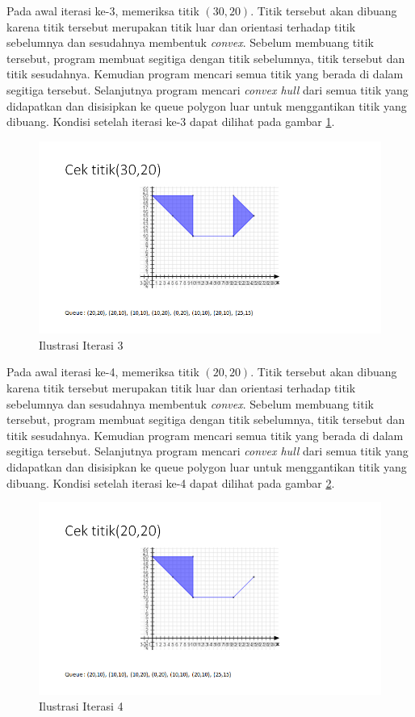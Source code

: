 \par Pada awal iterasi ke-3, memeriksa titik $(30,20)$. Titik tersebut akan dibuang karena titik tersebut merupakan titik luar dan orientasi terhadap titik sebelumnya dan sesudahnya membentuk \textit{convex}. Sebelum membuang titik tersebut, program membuat segitiga dengan titik sebelumnya, titik tersebut dan titik sesudahnya. Kemudian program mencari semua titik yang berada di dalam segitiga tersebut. Selanjutnya program mencari \textit{convex hull} dari semua titik yang didapatkan dan disisipkan ke queue polygon luar untuk menggantikan titik yang dibuang. Kondisi setelah iterasi ke-3 dapat dilihat pada gambar \ref{fig:iterasi-3}.
\begin{figure}[!h]
	\Centering
	\includegraphics [width=\columnwidth]{bab5/img/iterasi-3}
	\caption {Ilustrasi Iterasi 3}
	\label {fig:iterasi-3}
\end{figure}

\par Pada awal iterasi ke-4, memeriksa titik $(20,20)$. Titik tersebut akan dibuang karena titik tersebut merupakan titik luar dan orientasi terhadap titik sebelumnya dan sesudahnya membentuk \textit{convex}. Sebelum membuang titik tersebut, program membuat segitiga dengan titik sebelumnya, titik tersebut dan titik sesudahnya. Kemudian program mencari semua titik yang berada di dalam segitiga tersebut. Selanjutnya program mencari \textit{convex hull} dari semua titik yang didapatkan dan disisipkan ke queue polygon luar untuk menggantikan titik yang dibuang. Kondisi setelah iterasi ke-4 dapat dilihat pada gambar \ref{fig:iterasi-4}.
\begin{figure}[!h]
	\Centering
	\includegraphics [width=\columnwidth]{bab5/img/iterasi-4}
	\caption {Ilustrasi Iterasi 4}
	\label {fig:iterasi-4}
\end{figure}

